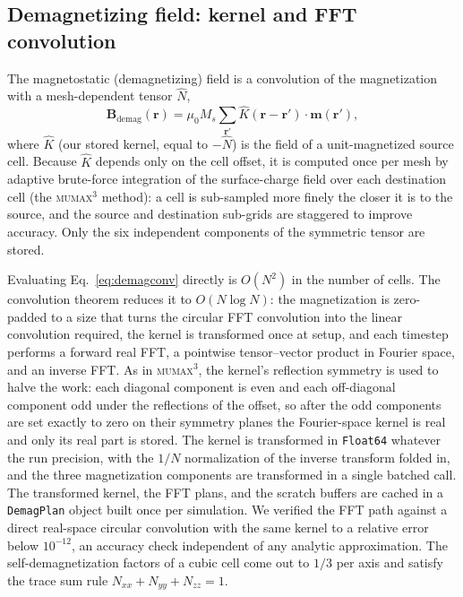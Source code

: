 \documentclass{article}      %
\newcommand{\mumax}{\textsc{mumax}$^3$}
\newcommand{\vm}{\bm{m}}
\newcommand{\vB}{\bm{B}}
\begin{document}
\subsection{Demagnetizing field: kernel and FFT convolution}
\label{sec:demag}

The magnetostatic (demagnetizing) field is a convolution of the magnetization
with a mesh-dependent tensor $\hat{N}$,
%
\begin{equation}
  \vB_{\mathrm{demag}}(\bm{r})
  = \mu_0 M_s \sum_{\bm{r}'} \hat{K}(\bm{r}-\bm{r}')\cdot\vm(\bm{r}'),
  \label{eq:demagconv}
\end{equation}
%
where $\hat{K}$ (our stored kernel, equal to $-\hat{N}$) is the field of a
unit-magnetized source cell. Because $\hat{K}$ depends only on the cell offset,
it is computed once per mesh by adaptive brute-force integration of the
surface-charge field over each destination cell (the \mumax{} method): a cell is
sub-sampled more finely the closer it is to the source, and the source and
destination sub-grids are staggered to improve accuracy. Only the six independent
components of the symmetric tensor are stored.

Evaluating Eq.~\eqref{eq:demagconv} directly is $O(N^2)$ in the number of cells.
The convolution theorem reduces it to $O(N\log N)$: the magnetization is
zero-padded to a size that turns the circular FFT convolution into the linear
convolution required, the kernel is transformed once at setup, and each timestep
performs a forward real FFT, a pointwise tensor--vector product in Fourier space,
and an inverse FFT. As in \mumax{}, the kernel's reflection symmetry is used to
halve the work: each diagonal component is even and each off-diagonal component
odd under the reflections of the offset, so after the odd components are set
exactly to zero on their symmetry planes the Fourier-space kernel is real and
only its real part is stored. The kernel is transformed in \texttt{Float64}
whatever the run precision, with the $1/N$ normalization of the inverse transform
folded in, and the three magnetization components are transformed in a single
batched call. The transformed kernel, the FFT plans, and the scratch
buffers are cached in a \texttt{DemagPlan} object built once per simulation. We
verified the FFT path against a direct real-space circular convolution with the
same kernel to a relative error below $10^{-12}$, an accuracy check independent of any
analytic approximation. The self-demagnetization factors of a cubic cell come out
to $1/3$ per axis and satisfy the trace sum rule $N_{xx}+N_{yy}+N_{zz}=1$.
\end{document}
